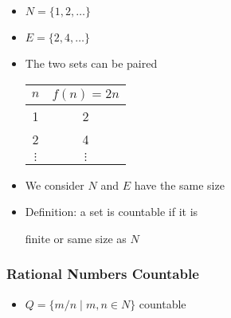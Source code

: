 \begin{frame}[allowframebreaks]
  \begin{itemize}
\item $N=\{1,2,\ldots\}$
\item $E=\{2,4,\ldots\}$
\item The two sets can be paired
  \begin{center}
    \begin{tabular}{cc}
$n$ & $f(n)=2n$\\ \hline
1 & 2 \\
2 & 4 \\
$\vdots$ & $\vdots$
    \end{tabular}
  \end{center}
\item We consider $N$ and $E$ have \alert{the same size}
\item Definition: a set is countable if it is 
  \begin{center}
finite or same size as $N$
\end{center}
\end{itemize}\end{frame} \begin{frame}[allowframebreaks] \frametitle{Rational Numbers Countable}
  \begin{itemize}
\item $Q=\{m/n
\mid m,n \in N\}$ countable



\end{itemize}
\end{frame}
